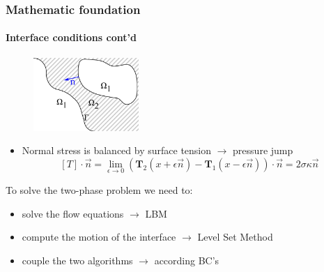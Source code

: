 \documentclass[ucs]{beamer}
\begin{document}
\begin{frame}
\frametitle{Mathematic foundation}
\framesubtitle{Interface conditions cont'd}
\vspace{-.5cm}
\begin{figure}[h!]
\includegraphics[width=4cm]{skizze.png}
\end{figure}
\vspace{-.5cm}
\begin{itemize}
\item<1->Normal stress is balanced by surface tension $\rightarrow$ pressure jump
  $$[T] \cdot \vec n= \lim_{\epsilon \to 0}(\textbf{T}_2(x+\epsilon \vec n) - \textbf{T}_1(x-\epsilon \vec n)) \cdot \vec n= 2\sigma \kappa \vec n$$
\end{itemize}
\vspace{-.5cm}
\end{frame}

\begin{frame}
To solve the two-phase problem we need to:
\begin{itemize}
\item<1-> solve the flow equations $\rightarrow$ LBM
\item<2-> compute the motion of the interface $\rightarrow$ Level Set Method
\item<3-> couple the two algorithms $\rightarrow$ according BC's %
\end{itemize}
\end{frame}
\end{document}
